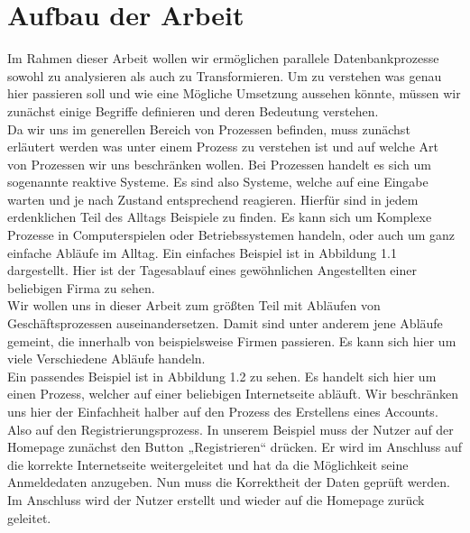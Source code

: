 \section{Aufbau der Arbeit}
Im Rahmen dieser Arbeit wollen wir ermöglichen parallele Datenbankprozesse sowohl zu analysieren als auch zu Transformieren. Um zu verstehen was genau hier passieren soll und wie eine Mögliche Umsetzung aussehen könnte, müssen wir zunächst einige Begriffe definieren und deren Bedeutung verstehen.\\
Da wir uns im generellen Bereich von Prozessen befinden, muss zunächst erläutert werden was unter einem Prozess zu verstehen ist und auf welche Art von Prozessen wir uns beschränken wollen.
Bei Prozessen handelt es sich um sogenannte reaktive Systeme. Es sind also Systeme, welche auf eine Eingabe warten und je nach Zustand entsprechend reagieren. Hierfür sind in jedem erdenklichen Teil des Alltags Beispiele zu finden. Es kann sich um Komplexe Prozesse in Computerspielen oder Betriebssystemen handeln, oder auch um ganz einfache Abläufe im Alltag. Ein einfaches Beispiel ist in Abbildung 1.1 dargestellt. Hier ist der Tagesablauf eines gewöhnlichen Angestellten einer beliebigen Firma zu sehen.\\
Wir wollen uns in dieser Arbeit zum größten Teil mit Abläufen von Geschäftsprozessen auseinandersetzen. Damit sind unter anderem jene Abläufe gemeint, die innerhalb von beispielsweise Firmen passieren. Es kann sich hier um viele Verschiedene Abläufe handeln.\\
Ein passendes Beispiel ist in Abbildung 1.2 zu sehen. Es handelt sich hier um einen Prozess, welcher auf einer beliebigen Internetseite abläuft. Wir beschränken uns hier der Einfachheit halber auf den Prozess des Erstellens eines Accounts. Also auf den Registrierungsprozess. In unserem Beispiel muss der Nutzer auf der Homepage zunächst den Button „Registrieren“ drücken. Er wird im Anschluss auf die korrekte Internetseite weitergeleitet und hat da die Möglichkeit seine Anmeldedaten anzugeben. Nun muss die Korrektheit der Daten geprüft werden. Im Anschluss wird der Nutzer erstellt und wieder auf die Homepage zurück geleitet.\\

